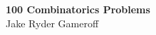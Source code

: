 \documentclass{article}
\begin{document}
\begin{center}
	\textbf{\large 100 Combinatorics Problems} \\
    \large Jake Ryder Gameroff 
\end{center}



\end{document}
